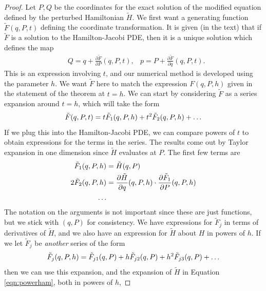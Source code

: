 \begin{proof}
	Let $P,Q$ be the coordinates for the exact solution of the modified equation defined by the perturbed Hamiltonian $\tilde{H}$.
	We first want a generating function $\tilde{F}(q,P,t)$ defining the coordinate transformation.
	It is given (in the text) that if $\tilde{F}$ is a solution to the Hamilton-Jacobi PDE, then it is a unique solution which defines the map
	\begin{align*}
		&Q = q + \frac{\partial \tilde{F}}{\partial P}(q,P,t), &p = P + \frac{\partial \tilde{F}}{\partial q}(q,P,t).
	\end{align*}
	This is an expression involving $t$, and our numerical method is developed using the parameter $h$.
	We want $\tilde{F}$ here to match the expression $F(q,P,h)$ given in the statement of the theorem at $t=h$.
	We can start by considering $\tilde{F}$ as a series expansion around $t=h$, which will take the form
	\begin{equation*}
		\tilde{F}(q,P,t) = t \tilde{F}_1 (q,P,h) + t^2 \tilde{F}_2 (q,P,h) + \mathellipsis
	\end{equation*}
	If we plug this into the Hamilton-Jacobi PDE, we can compare powers of $t$ to obtain expressions for the terms in the series.
	The results come out by Taylor expansion in one dimension since $\tilde{H}$ evaluates at $P$.
	The first few terms are
	\begin{equation}
		\begin{aligned}
			\tilde{F}_1(q,P,h) &= \tilde{H}(q,P) \\
			2 \tilde{F}_2(q,P,h) &= \frac{\partial \tilde{H}}{\partial q}(q,P,h) \cdot \frac{\partial \tilde{F}_1}{\partial P}(q,P,h) \\
			\mathellipsis
		\end{aligned}
		\label{eqn:genh}
	\end{equation}
	The notation on the arguments is not important since these are just functions,
	but we stick with $(q,P)$ for consistency.
	We have expressions for $\tilde{F}_j$ in terms of derivatives of $\tilde{H}$,
	and we also have an expression for $\tilde{H}$ about $H$ in powers of $h$.
	If we let $\tilde{F}_j$ be \textit{another} series of the form
	\begin{equation*}
		\tilde{F}_j(q,P,h) = \tilde{F}_{j1}(q,P) + h \tilde{F}_{j2}(q,P) + h^2\tilde{F}_{j3}(q,P) + \mathellipsis
	\end{equation*}
	then we can use this expansion, and the expansion of $\tilde{H}$ in Equation \ref{eqn:powerham},
	both in powers of $h$,

\end{proof}
